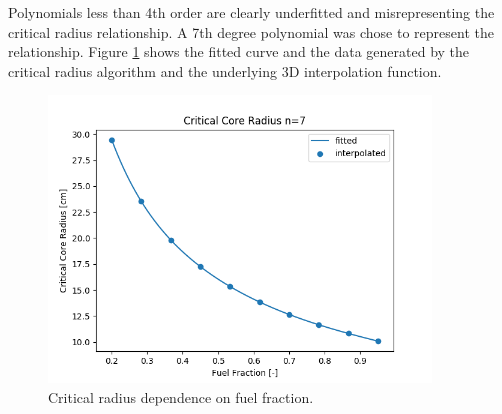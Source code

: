 Polynomials less than 4th order are clearly underfitted and misrepresenting the
critical radius relationship. A 7th degree polynomial was chose to represent the
relationship. Figure \ref{fig:core_r_co2_uo2} shows the fitted curve and the
data generated by the critical radius algorithm and the underlying 3D
interpolation function.

\begin{figure}[h]
    \centering
    \includegraphics[width=4in]{../images/uo2_co2_core_r.png}
\caption{Critical radius dependence on fuel fraction.}
\label{fig:core_r_co2_uo2}
\end{figure}

